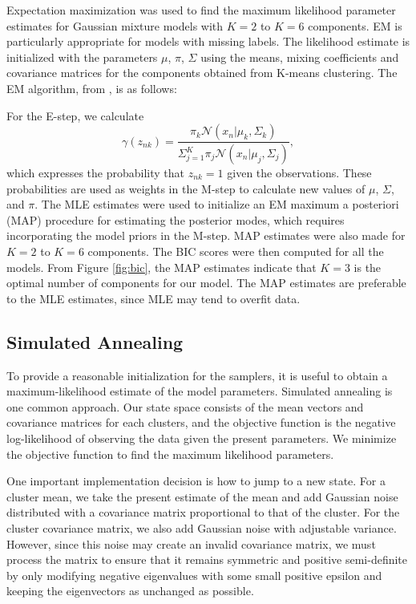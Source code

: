 \documentclass[twoside]{article}
\newcommand{\N}{\mathcal{N}}
\theoremstyle{theorem}
\theoremstyle{theorem}
\theoremstyle{theorem}
\theoremstyle{lemma}
\theoremstyle{definition}
\theoremstyle{example}
\begin{document}
Expectation maximization was used to find the maximum likelihood parameter estimates for Gaussian mixture models with $K = 2$ to $K = 6$ components. EM is particularly appropriate for models with missing labels. The likelihood estimate is initialized with the parameters $\mu$, $\pi$, $\Sigma$ using the means, mixing coefficients and covariance matrices for the components obtained from K-means clustering. The EM algorithm, from \cite{Bishop}, is as follows: 

For the E-step, we calculate   
\begin{equation}
\gamma{(z_{nk})} = \frac{\pi_k \N(x_n| \mu_k, \Sigma_k)}{\Sigma_{j=1}^K \pi_j \N(x_n| \mu_j, \Sigma_j)},
\end{equation}
which expresses the probability that $z_{nk}=1$ given the observations. These probabilities are used as weights in the M-step to calculate new values of $\mu$, $\Sigma$, and $\pi$. The MLE estimates were used to initialize an EM maximum a posteriori (MAP) procedure for estimating the posterior modes, which requires incorporating the model priors in the M-step. MAP estimates were also made for $K=2$ to $K=6$ components. The BIC scores were then computed for all the models. From Figure \ref{fig:bic}, the MAP estimates indicate that $K = 3$ is the optimal number of components for our model. The MAP estimates are preferable to the MLE estimates, since MLE may tend to overfit data. 

\subsection{Simulated Annealing}

To provide a reasonable initialization for the samplers, it is useful to obtain a maximum-likelihood estimate of the model parameters. Simulated annealing is one common approach.  Our state space consists of the mean vectors and covariance matrices for each clusters, and the objective function is the negative log-likelihood of observing the data given the present parameters. We minimize the objective function to find the maximum likelihood parameters.

One important implementation decision is how to jump to a new state. For a cluster mean, we take the present estimate of the mean and add Gaussian noise distributed with a covariance matrix proportional to that of the cluster. For the cluster covariance matrix, we also add Gaussian noise with adjustable variance. However, since this noise may create an invalid covariance matrix, we must process the matrix to ensure that it remains symmetric and positive semi-definite by only modifying negative eigenvalues with some small positive epsilon and keeping the eigenvectors as unchanged as possible.
\end{document}

